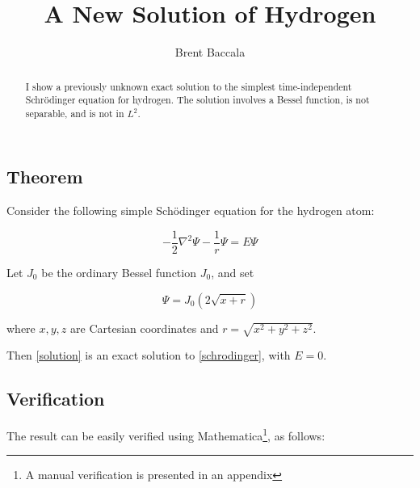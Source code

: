 \documentclass{article}
\title{A New Solution of Hydrogen}
\author{Brent Baccala}
\begin{document}
\parindent 0pt

\maketitle

\begin{abstract}
I show a previously unknown exact solution to the simplest time-independent Schr\"odinger equation for hydrogen.
The solution involves a Bessel function, is not separable, and is not in $L^2$.
\end{abstract}

\subsection*{Theorem}

Consider the following simple Sch\"odinger equation for the hydrogen atom:

\begin{equation}
\label{schrodinger}
-\frac{1}{2}\nabla^2 \Psi - \frac{1}{r}\Psi = E \Psi
\end{equation}

Let $J_0$ be the ordinary Bessel function $J_0$, and set

\begin{equation}
\label{solution}
\Psi = J_0(2\sqrt{x+r})
\end{equation}

where $x,y,z$ are Cartesian coordinates and $r=\sqrt{x^2+y^2+z^2}$.

\vskip 12pt

Then \eqref{solution} is an exact solution to \eqref{schrodinger}, with $E=0$.

\subsection*{Verification}

The result can be easily verified using Mathematica\footnote{A manual verification is presented in an appendix}, as follows:
\end{document}
